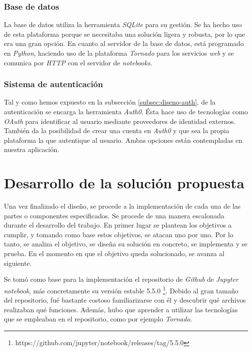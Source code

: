 \documentclass[11pt,spanish,listoffigures]{tfgetsinf}
\begin{document}
\subsection{Base de datos}
\label{subsec:tecno-DB}

La base de datos utiliza la herramienta \textit{SQLite} para su gestión. Se ha hecho uso de esta plataforma porque se necesitaba una solución ligera y robusta, por lo que era una gran opción. En cuanto al servidor de la base de datos, está programado en \textit{Python}, haciendo uso de la plataforma \textit{Tornado} para los servicios \textit{web} y se comunica por \textit{HTTP} con el servidor de \textit{notebooks}.


\subsection{Sistema de autenticación}
\label{subsec:tecno-auth}

Tal y como hemos expuesto en la subsección \ref{subsec:diseno-auth}, de la autenticación se encarga la herramienta \textit{Auth0}. Ésta hace uso de tecnologías como \textit{OAuth} para identificar al usuario mediante proveedores de identidad externos. También da la posibilidad de crear una cuenta en \textit{Auth0} y que sea la propia plataforma la que autentique al usuario. Ambas opciones están contempladas en nuestra aplicación.





\chapter{Desarrollo de la solución propuesta}
\label{ch:desarrollo-solucion}

Una vez finalizado el diseño, se procede a la implementación de cada una de las partes o componentes especificados. Se procede de una manera escalonada durante el desarrollo del trabajo. En primer lugar se plantean los objetivos a cumplir, y tomando como base estos objetivos, se atacan uno por uno. Por lo tanto, se analiza el objetivo, se diseña su solución en concreto, se implementa y se prueba. En el momento en que el objetivo queda solucionado, se avanza al siguiente.

Se tomó como base para la implementación el repositorio de \textit{Github} de \textit{Jupyter notebook}, más concretamente su versión estable 5.5.0 \footnote{https://github.com/jupyter/notebook/releases/tag/5.5.0}. Debido al gran tamaño del repositorio, fué bastante costoso familiarizarse con él y descubrir qué archivos realizaban qué funciones. Además, hubo que aprender a utilizar las tecnologías que se empleaban en el repositorio, como por ejemplo \textit{Tornado}.
\end{document}
